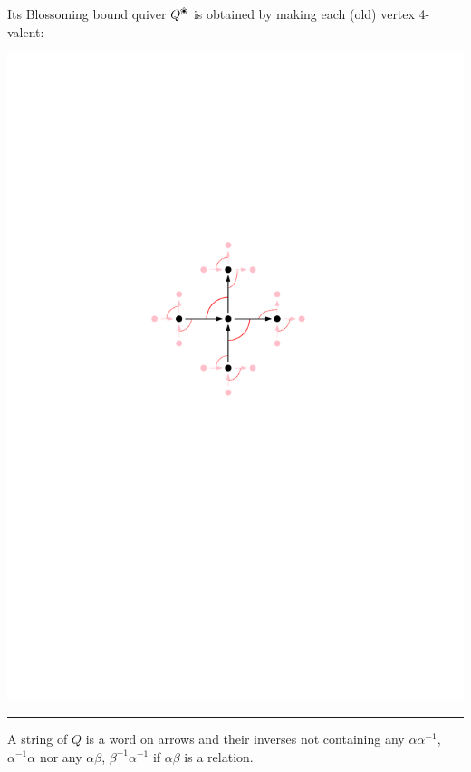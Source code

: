 \documentclass[portrait,final,a0paper,fontscale=0.25]{baposter}
\newcommand{\blossom}{^\text{\ding{96}}} %
\theoremstyle{definition}
\begin{document}
\begin{poster}
{\begin{minipage}{7.2cm}
Its {\color{green} Blossoming bound quiver} $Q\blossom$ is obtained by making each (old) vertex 4-valent:
\end{minipage}

\vspace*{-1.9cm}\hspace*{7.5cm}\includegraphics[scale=.3]{BlossomingQuiverGentle}

\vspace{-.35cm}
\hspace{-.25cm}
{\color{green} \rule{10.02cm}{1pt}}
\vspace{-.35cm}

A {\color{green} string} of $Q$ is a word on arrows and their inverses not containing any $\alpha\alpha^{-1}$, $\alpha^{-1}\alpha$ nor any $\alpha\beta$, $\beta^{-1}\alpha^{-1}$ if $\alpha\beta$ is a relation.

\medskip

}
\end{poster}
\end{document}
